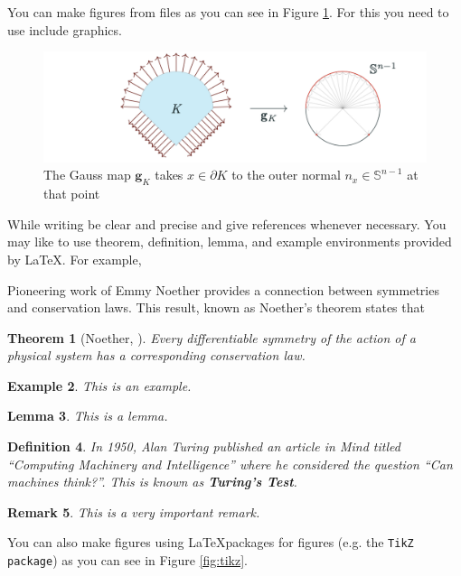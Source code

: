 \documentclass[12pt, a4paper,oneside]{book}
\newtheorem{theorem}{Theorem}[section]
\newtheorem{lemma}[theorem]{Lemma}
\newtheorem{definition}[theorem]{Definition}
\newtheorem{example}[theorem]{Example}
\newtheorem{remark}[theorem]{Remark}
\numberwithin{equation}{section}
\begin{document}
You can make figures from files as you can see in Figure \ref{fig:A3.1}. For this you need to use include graphics. 

\begin{figure}[htb]
\centerline{\includegraphics[width=1\textwidth]{Figure}}
\caption{The Gauss map $\mathbf{g}_{K}$ takes $x\in \partial K$ to the outer normal $n_x\in\mathbb{S}^{n-1}$ at that point}
\label{fig:A3.1}
\end{figure}


While writing be clear and precise and give references whenever necessary. You may like to use theorem, definition, lemma, and example environments provided by \LaTeX. For example,

Pioneering work of Emmy Noether \cite{Noether} provides a connection between symmetries and conservation laws. This result, known as Noether's theorem states that

\begin{theorem}[Noether, \cite{Noether}]
Every differentiable symmetry of the action of a physical system has a corresponding conservation law.
\end{theorem}

\begin{example}
This is an example.
\end{example}

\begin{lemma}
This is a lemma.
\end{lemma}

\begin{definition}
In 1950, Alan Turing published an article \cite{Turing} in \textit{Mind} 
titled ``Computing Machinery and Intelligence'' where he considered the question ``Can machines think?''. This is known as {\bf Turing's Test}. 
\end{definition}

\begin{remark}
This is a very important remark. 
\end{remark}

You can also make figures using \LaTeX packages for figures (e.g. the {\tt TikZ package}) as you can see in Figure \ref{fig:tikz}.
\end{document}
